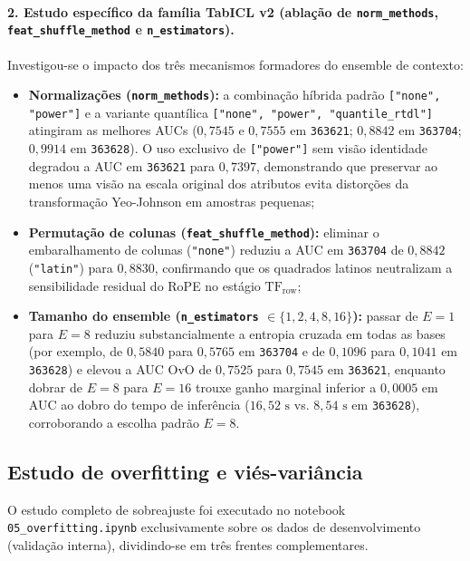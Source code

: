 \documentclass[11pt,a4paper]{article}
\begin{document}
\paragraph{2. Estudo específico da família TabICL v2 (ablação de \texttt{norm\_methods}, \texttt{feat\_shuffle\_method} e \texttt{n\_estimators}).}
Investigou-se o impacto dos três mecanismos formadores do ensemble de contexto:
\begin{itemize}[leftmargin=2em]
    \item \textbf{Normalizações (\texttt{norm\_methods}):} a combinação híbrida padrão \texttt{["none", "power"]} e a variante quantílica \texttt{["none", "power", "quantile\_rtdl"]} atingiram as melhores AUCs ($0{,}7545$ e $0{,}7555$ em \texttt{363621}; $0{,}8842$ em \texttt{363704}; $0{,}9914$ em \texttt{363628}). O uso exclusivo de \texttt{["power"]} sem visão identidade degradou a AUC em \texttt{363621} para $0{,}7397$, demonstrando que preservar ao menos uma visão na escala original dos atributos evita distorções da transformação Yeo-Johnson em amostras pequenas;
    \item \textbf{Permutação de colunas (\texttt{feat\_shuffle\_method}):} eliminar o embaralhamento de colunas (\texttt{"none"}) reduziu a AUC em \texttt{363704} de $0{,}8842$ (\texttt{"latin"}) para $0{,}8830$, confirmando que os quadrados latinos neutralizam a sensibilidade residual do RoPE no estágio $\mathrm{TF}_{\mathrm{row}}$;
    \item \textbf{Tamanho do ensemble (\texttt{n\_estimators} $\in \{1, 2, 4, 8, 16\}$):} passar de $E = 1$ para $E = 8$ reduziu substancialmente a entropia cruzada em todas as bases (por exemplo, de $0{,}5840$ para $0{,}5765$ em \texttt{363704} e de $0{,}1096$ para $0{,}1041$ em \texttt{363628}) e elevou a AUC OvO de $0{,}7525$ para $0{,}7545$ em \texttt{363621}, enquanto dobrar de $E = 8$ para $E = 16$ trouxe ganho marginal inferior a $0{,}0005$ em AUC ao dobro do tempo de inferência ($16{,}52\text{ s}$ vs. $8{,}54\text{ s}$ em \texttt{363628}), corroborando a escolha padrão $E = 8$.
\end{itemize}

\subsection{Estudo de overfitting e viés-variância}
\label{sec:overfitting}

O estudo completo de sobreajuste foi executado no notebook \texttt{05\_overfitting.ipynb} exclusivamente sobre os dados de desenvolvimento (validação interna), dividindo-se em três frentes complementares.
\end{document}
